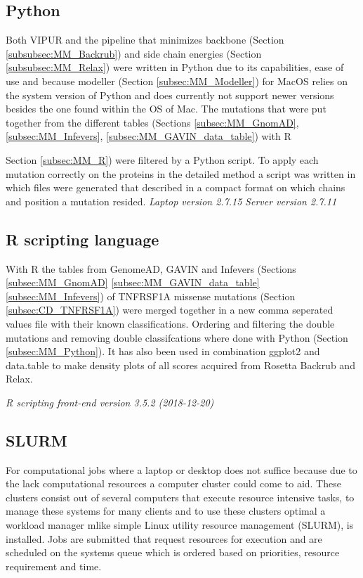 \subsection{Python}
Both VIPUR and the pipeline that minimizes backbone (Section \ref{subsubsec:MM_Backrub}) and side chain energies (Section \ref{subsubsec:MM_Relax}) were written in Python due to its capabilities, ease of use and because modeller (Section \ref{subsec:MM_Modeller}) for MacOS relies on the system version of Python and does currently not support newer versions besides the one found within the OS of Mac. The mutations that were put together from the different tables (Sections \ref{subsec:MM_GnomAD}, \ref{subsec:MM_Infevers}, \ref{subsec:MM_GAVIN_data_table}) with R {Section \ref{subsec:MM_R}) were filtered by a Python script. To apply each mutation correctly on the proteins in the detailed method a script was written in which files were generated that described in a compact format on which chains and position a mutation resided.
\label{subsec:MM_Python}
\newline
\textit{Laptop version 2.7.15}
\newline
\textit{Server version 2.7.11}

\subsection{R scripting language}
With R the tables from GenomeAD, GAVIN and Infevers (Sections \ref{subsec:MM_GnomAD} \ref{subsec:MM_GAVIN_data_table} \ref{subsec:MM_Infevers}) of TNFRSF1A missense mutations (Section \ref{subsec:CD_TNFRSF1A}) were merged together in a new comma seperated values file with their known classifications. Ordering and filtering the double mutations and removing double classifcations where done with Python (Section \ref{subsec:MM_Python}). It has also been used in combination ggplot2 \cite{wickham_create_nodate} and data.table \cite{dowle_rs_2019} to make density plots of all scores acquired from Rosetta Backrub and Relax.

\label{subsec:MM_R}
\newline
\textit{R scripting front-end version 3.5.2 (2018-12-20)}

\subsection{SLURM}
For computational jobs where a laptop or desktop does not suffice because due to the lack computational resources a computer cluster could come to aid. These clusters consist out of several computers that execute resource intensive tasks, to manage these systems for many clients and to use these clusters optimal a workload manager mlike simple Linux utility resource management (SLURM), is installed. Jobs are submitted that request resources for execution and are scheduled on the systems queue which is ordered based on priorities, resource requirement and time.
\label{subsec:MM_SLURM}

}
